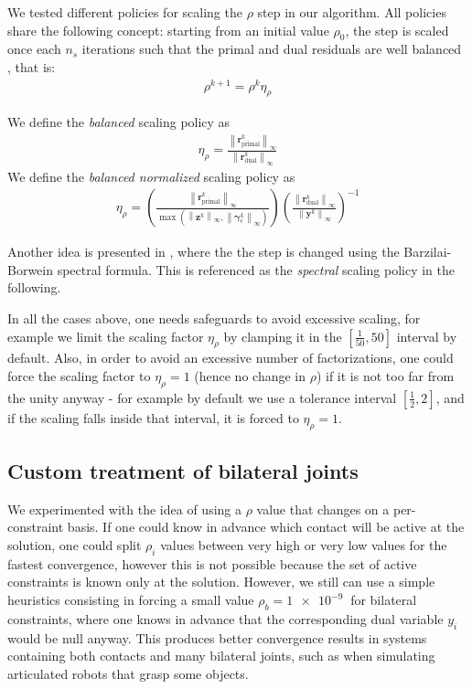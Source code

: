 \documentclass[AMA,STIX1COL]{WileyNJD-v2}
\newcommand{\vect}[1]{\bm{#1}}
\newcommand{\norm}[1]{\left\lVert#1\right\rVert}
\begin{document}
We tested different policies for scaling the $\rho$ step in our algorithm. 
All policies share the following concept: starting from an initial value $\rho_0$, the step is scaled once each $n_s$ iterations such that the primal and dual residuals are well balanced 
\cite{Wohlberg2017}, %
that is:
\begin{align}
	\rho^{k+1} = \rho^{k} \eta_\rho 
\end{align}
  
We define the \textit{balanced} scaling policy as
\begin{align}
	\eta_\rho = \frac{ \norm{\vect{r}_{\text{primal}}^{k}}_\infty }{ \norm{\vect{r}_{\text{dual}}^{k}}_\infty }  
\end{align}
We define the \textit{balanced normalized} scaling policy as
\begin{align}
	\eta_\rho = \left( \frac{\norm{\vect{r}_{\text{primal}}^{k}}_\infty}{ \max{ \left( \norm{\vect{z}^k}_\infty,\norm{\vect{\gamma}_\epsilon^k}_\infty \right) } } \right)
															\left( \frac{\norm{\vect{r}_{\text{dual}}^{k}}_\infty}  { \norm{\vect{y}^k }_\infty }  \right)^{-1}
\end{align}

Another idea is presented in 
 \cite{Xu_adaptive_2017}, %
where the the step is changed using the Barzilai-Borwein spectral formula. This is referenced as the \textit{spectral} scaling policy in the following.

In all the cases above, one needs safeguards to avoid excessive scaling, for example we limit the scaling factor $\eta_\rho$ by clamping it in the $\left[\frac{1}{50}, 50 \right]$ interval by default. Also, in order to avoid an excessive number of factorizations, one could force the scaling factor to $\eta_\rho=1$ (hence no change in $\rho$) if it is not too far from the unity anyway - for example by default we use a tolerance interval $\left[\frac{1}{2}, 2 \right]$, and if the scaling falls inside that interval, it is forced to $\eta_\rho=1$.


\subsection{Custom treatment of bilateral joints}

We experimented with the idea of using a $\rho$ value that changes on a per-constraint basis. If one could know in advance which contact will be active at the solution, one could split $\rho_i$ values between very high or very low values for the fastest convergence, however this is not possible because the set of active constraints is known only at the solution. However, we still can use a
simple heuristics consisting in forcing a small value $\rho_b = \SI{1e-9}{}$ for bilateral constraints, where one knows in advance that the corresponding dual variable $y_i$ would be null anyway. This produces better convergence results in systems containing both contacts and many bilateral joints, such as when simulating articulated robots that grasp some objects. 
\end{document}
